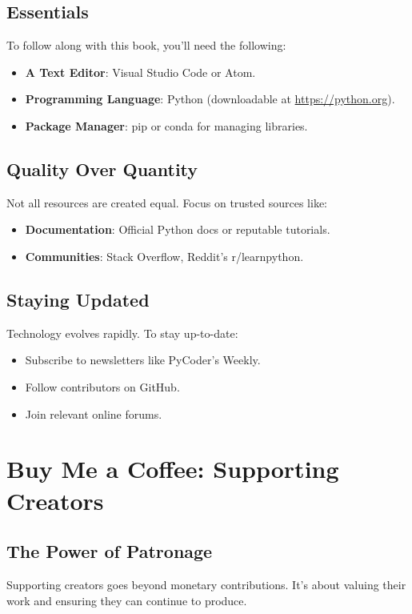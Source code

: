 \subsection{Essentials}
To follow along with this book, you\textquoteright ll need the following:
\begin{itemize}
\item \textbf{A Text Editor}: Visual Studio Code or Atom.
\item \textbf{Programming Language}: Python (downloadable at \url{https://python.org}).
\item \textbf{Package Manager}: pip or conda for managing libraries.
\end{itemize}

\subsection{Quality Over Quantity}
Not all resources are created equal. Focus on trusted sources like:
\begin{itemize}
\item \textbf{Documentation}: Official Python docs or reputable tutorials.
\item \textbf{Communities}: Stack Overflow, Reddit\textquoteright s r/learnpython.
\end{itemize}

\subsection{Staying Updated}
Technology evolves rapidly. To stay up-to-date:
\begin{itemize}
\item Subscribe to newsletters like PyCoder\textquoteright s Weekly.
\item Follow contributors on GitHub.
\item Join relevant online forums.
\end{itemize}

\section{Buy Me a Coffee: Supporting Creators}
\subsection{The Power of Patronage}
Supporting creators goes beyond monetary contributions. It\textquoteright s about valuing their work and ensuring they can continue to produce.

